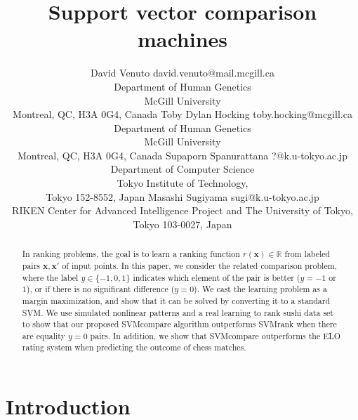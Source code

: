 \documentclass[twoside,11pt]{article}
\newcommand{\RR}{\mathbb R}
\begin{document}
	
	\title{Support vector comparison machines}
	
	\author{\name David Venuto \email david.venuto@mail.mcgill.ca \\
		\addr Department of Human Genetics\\
		McGill University \\
		Montreal, QC, H3A 0G4, Canada
		\AND
		\name Toby Dylan Hocking \email toby.hocking@mcgill.ca \\
		\addr Department of Human Genetics\\
		McGill University \\
		Montreal, QC, H3A 0G4, Canada
		\AND
		\name Supaporn Spanurattana \email ?@k.u-tokyo.ac.jp \\
		\addr Department of Computer Science\\
		Tokyo Institute of Technology,  \\
		Tokyo 152-8552, Japan
		\AND
		\name Masashi Sugiyama \email sugi@k.u-tokyo.ac.jp \\
		\addr RIKEN Center for Advanced Intelligence Project and The University of Tokyo,  \\
		Tokyo 103-0027, Japan}
	
	
\maketitle


\begin{abstract}
  In ranking problems, the goal is to learn a ranking function
  $r(\mathbf x)\in\RR$ from labeled pairs $\mathbf x,\mathbf x'$ of
  input points. In this paper, we consider the related comparison
  problem, where the label $y\in\{-1,0,1\}$ indicates which element of
  the pair is better ($y = -1$ or $1$), or if there is no significant difference ($y=0$). We
  cast the learning problem as a margin maximization, and show that it
  can be solved by converting it to a standard SVM. We use simulated
  nonlinear patterns and a real learning to rank sushi data set to
  show that our proposed SVMcompare algorithm outperforms SVMrank when
  there are equality $y=0$ pairs.  In addition, we show that SVMcompare outperforms the ELO rating system when predicting the outcome of chess matches.
\end{abstract}


\newpage

\section{Introduction}
\end{document}
